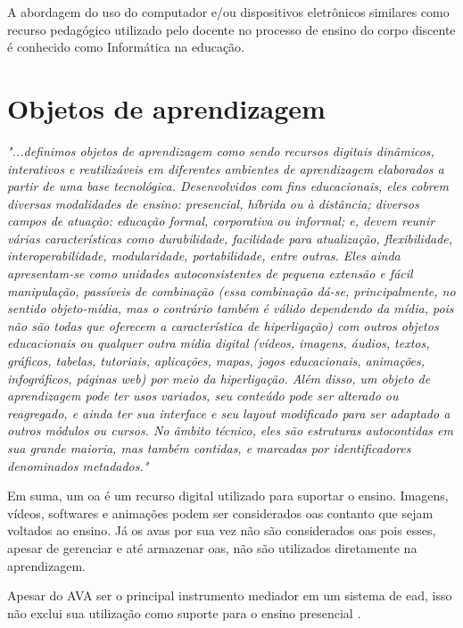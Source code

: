 A abordagem do uso do computador e/ou dispositivos eletrônicos similares como recurso pedagógico utilizado pelo docente no processo de ensino do corpo discente é conhecido como Informática na educação. \cite{kenski07}

\section{Objetos de aprendizagem}
\label{sec:objetosaprendizagem}

\textit{"...definimos objetos de aprendizagem como sendo recursos digitais dinâmicos, interativos e reutilizáveis em diferentes ambientes de aprendizagem elaborados a partir de uma base tecnológica. Desenvolvidos com fins educacionais, eles cobrem diversas modalidades de ensino: presencial, híbrida ou à distância; diversos campos de atuação: educação formal, corporativa ou informal; e, devem reunir várias características como durabilidade, facilidade para atualização, flexibilidade, interoperabilidade, modularidade, portabilidade, entre outras. Eles ainda apresentam-se como unidades autoconsistentes de pequena extensão e fácil manipulação, passíveis de combinação (essa combinação dá-se, principalmente, no sentido objeto-mídia, mas o contrário também é válido dependendo da mídia, pois não são todas que oferecem a característica de hiperligação) com outros objetos educacionais ou qualquer outra mídia digital (vídeos, imagens, áudios, textos, gráficos, tabelas, tutoriais, aplicações, mapas, jogos educacionais, animações, infográficos, páginas web) por meio da hiperligação. Além disso, um objeto de aprendizagem pode ter usos variados, seu conteúdo pode ser alterado ou reagregado, e ainda ter sua interface e seu layout modificado para ser adaptado a outros módulos ou cursos. No âmbito técnico, eles são estruturas autocontidas em sua grande maioria, mas também contidas, e marcadas por identificadores denominados metadados."} \cite{audino12}

Em suma, um \acrfull{oa} é um recurso digital utilizado para suportar o ensino. Imagens, vídeos, softwares e animações podem ser considerados \acrshort{oa}s contanto que sejam voltados ao ensino. Já os \acrfull{avas} por sua vez não são considerados \acrshort{oa}s pois esses, apesar de gerenciar e até armazenar \acrshort{oa}s, não são utilizados diretamente na aprendizagem. \cite{wiley02} \cite{braga14}

Apesar do AVA ser o principal instrumento mediador em um sistema de \acrfull{ead}, isso não exclui sua utilização como suporte para o ensino presencial \cite{belmonte10}.

